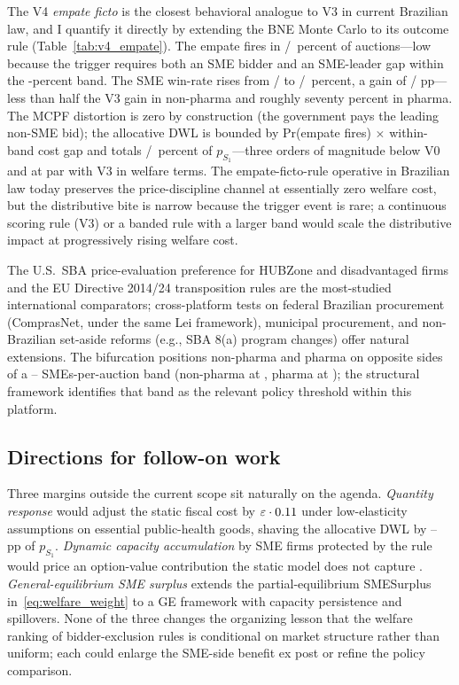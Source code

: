 The V4 \emph{empate ficto} is the closest behavioral analogue to V3 in current Brazilian law, and I quantify it directly by extending the BNE Monte Carlo to its outcome rule (Table~\ref{tab:v4_empate}). The empate fires in \vFourFireRateNp/\vFourFireRatePh~percent of auctions---low because the trigger requires both an SME bidder and an SME-leader gap within the \empateBand-percent band. The SME win-rate rises from \vFourSmeWinSoneNp/\vFourSmeWinSonePh{} to \vFourSmeWinVfourNp/\vFourSmeWinVfourPh~percent, a gain of \vFourSmeWinGainNp/\vFourSmeWinGainPh{} pp---less than half the V3 gain in non-pharma and roughly seventy percent in pharma. The MCPF distortion is zero by construction (the government pays the leading non-SME bid); the allocative DWL is bounded by Pr(empate fires) $\times$ within-band cost gap and totals \vFourLossPctNp/\vFourLossPctPh~percent of $p_{S_1}$---three orders of magnitude below V0 and at par with V3 in welfare terms. The empate-ficto-rule operative in Brazilian law today preserves the price-discipline channel at essentially zero welfare cost, but the distributive bite is narrow because the trigger event is rare; a continuous scoring rule (V3) or a banded rule with a larger band would scale the distributive impact at progressively rising welfare cost.

The U.S.\ SBA price-evaluation preference for HUBZone and disadvantaged firms and the EU Directive 2014/24 transposition rules are the most-studied international comparators; cross-platform tests on federal Brazilian procurement (ComprasNet, under the same Lei \leiNova{} framework), municipal procurement, and non-Brazilian set-aside reforms (e.g., SBA 8(a) program changes) offer natural extensions. The bifurcation positions non-pharma and pharma on opposite sides of a \smesPerAucBandLo--\smesPerAucBandHi{} SMEs-per-auction band (non-pharma at \bneNsmePostNp, pharma at \bneNsmePostPh); the structural framework identifies that band as the relevant policy threshold within this platform.

\subsection{Directions for follow-on work}

Three margins outside the current scope sit naturally on the agenda. \emph{Quantity response} would adjust the static fiscal cost by $\varepsilon \cdot 0.11$ under low-elasticity assumptions on essential public-health goods, shaving the allocative DWL by \ppShavedLo--\ppShavedHi{} pp of $p_{S_1}$. \emph{Dynamic capacity accumulation} by SME firms protected by the rule would price an option-value contribution the static model does not capture \citep{ferraz2016, szerman2023}. \emph{General-equilibrium SME surplus} extends the partial-equilibrium SMESurplus in~\eqref{eq:welfare_weight} to a GE framework with capacity persistence and spillovers. None of the three changes the organizing lesson that the welfare ranking of bidder-exclusion rules is conditional on market structure rather than uniform; each could enlarge the SME-side benefit ex post or refine the policy comparison.
